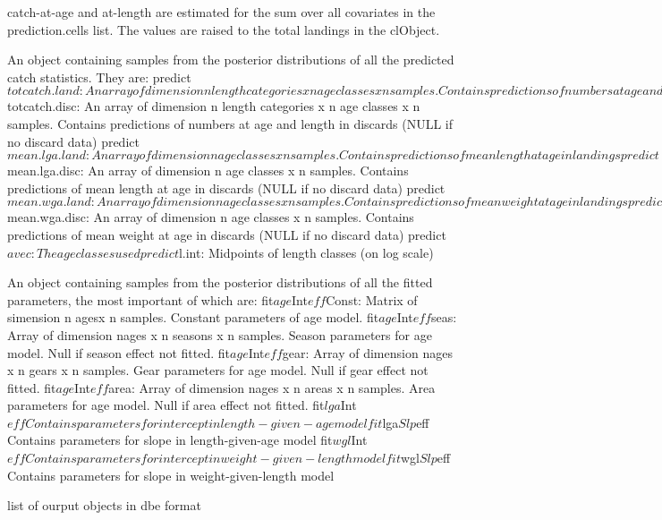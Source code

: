 \begin{Details}\relax
catch-at-age and at-length are estimated for the sum over all covariates in the prediction.cells 
list. The values are raised to the total landings in the clObject.
\end{Details}
\begin{Value}
\begin{ldescription}
\item[\code{predict}] An object containing samples from the posterior distributions of all the 
predicted catch statistics. They are:
predict$totcatch.land: An array of dimension n length categories x n age classes x n samples. 
Contains predictions of numbers at age and length in landings.
predict$totcatch.disc: An array of dimension n length categories x n age classes x n samples. 
Contains predictions of numbers at age and length in discards (NULL if no discard data)
predict$mean.lga.land: An array of dimension n age classes x n samples. Contains predictions of 
mean length at age in landings
predict$mean.lga.disc: An array of dimension n age classes x n samples. Contains predictions of 
mean length at age in discards (NULL if no discard data)
predict$mean.wga.land: An array of dimension n age classes x n samples. Contains predictions of 
mean weight at age in landings
predict$mean.wga.disc: An array of dimension n age classes x n samples. Contains predictions of 
mean weight at age in discards (NULL if no discard data)
predict$avec: The age classes used
predict$l.int: Midpoints of length classes (on log scale)

\item[\code{fit}] An object containing samples from the posterior distributions of all the fitted 
parameters, the most important of which are:
fit$age$Int$eff$Const: Matrix of simension n agesx n samples. Constant parameters of age model.
fit$age$Int$eff$seas: Array of dimension nages x n seasons x n samples. Season parameters for age 
model. Null if season effect not fitted.
fit$age$Int$eff$gear: Array of dimension nages x n gears x n samples. Gear parameters for age 
model. Null if gear effect not fitted.
fit$age$Int$eff$area: Array of dimension nages x n areas x n samples. Area parameters for age 
model. Null if area effect not fitted.
fit$lga$Int$eff Contains parameters for intercept in length-given-age model
fit$lga$Slp$eff Contains parameters for slope in length-given-age model
fit$wgl$Int$eff Contains parameters for intercept in weight-given-length model
fit$wgl$Slp$eff Contains parameters for slope in weight-given-length model

\item[\code{dbeObject.list}] list of ourput objects in dbe format
\end{ldescription}
\end{Value}
